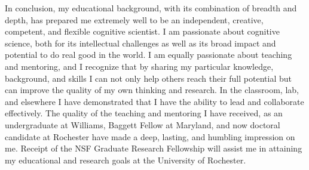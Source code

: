 \documentclass[12pt]{article}
\begin{document}

In conclusion, my educational background, with its combination of breadth and depth, has prepared me extremely well to be an independent, creative, competent, and flexible cognitive scientist.  I am passionate about cognitive science, both for its intellectual challenges as well as its broad impact and potential to do real good in the world.  I am equally passionate about teaching and mentoring, and I recognize that by sharing my particular knowledge, background, and skills I can not only help others reach their full potential but can improve the quality of my own thinking and research.  In the classroom, lab, and elsewhere I have demonstrated that I have the ability to lead and collaborate effectively.  The quality of the teaching and mentoring I have received, as an undergraduate at Williams, Baggett Fellow at Maryland, and now doctoral candidate at Rochester have made a deep, lasting, and humbling impression on me.  Receipt of the NSF Graduate Research Fellowship will assist me in attaining my educational and research goals at the University of Rochester.



%
\end{document}
